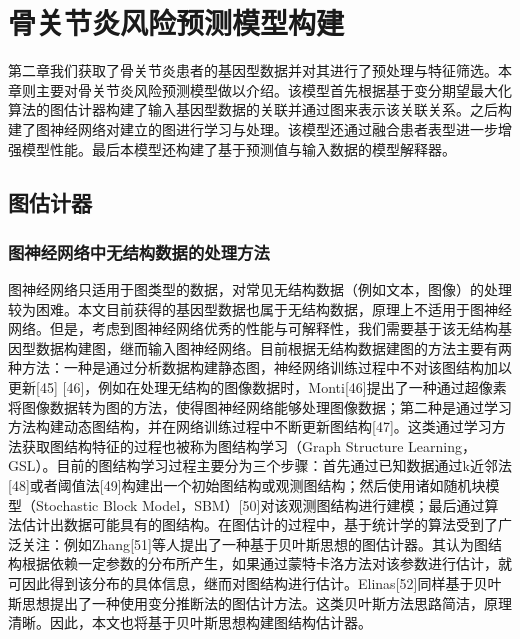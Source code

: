 \documentclass[
]{article}
\begin{document}
\hypertarget{ux9aa8ux5173ux8282ux708eux98ceux9669ux9884ux6d4bux6a21ux578bux6784ux5efa}{%
\section{骨关节炎风险预测模型构建}\label{ux9aa8ux5173ux8282ux708eux98ceux9669ux9884ux6d4bux6a21ux578bux6784ux5efa}}

第二章我们获取了骨关节炎患者的基因型数据并对其进行了预处理与特征筛选。本章则主要对骨关节炎风险预测模型做以介绍。该模型首先根据基于变分期望最大化算法的图估计器构建了输入基因型数据的关联并通过图来表示该关联关系。之后构建了图神经网络对建立的图进行学习与处理。该模型还通过融合患者表型进一步增强模型性能。最后本模型还构建了基于预测值与输入数据的模型解释器。

\hypertarget{ux56feux4f30ux8ba1ux5668}{%
\subsection{图估计器}\label{ux56feux4f30ux8ba1ux5668}}

\hypertarget{ux56feux795eux7ecfux7f51ux7edcux4e2dux65e0ux7ed3ux6784ux6570ux636eux7684ux5904ux7406ux65b9ux6cd5}{%
\subsubsection{图神经网络中无结构数据的处理方法}\label{ux56feux795eux7ecfux7f51ux7edcux4e2dux65e0ux7ed3ux6784ux6570ux636eux7684ux5904ux7406ux65b9ux6cd5}}

图神经网络只适用于图类型的数据，对常见无结构数据（例如文本，图像）的处理较为困难。本文目前获得的基因型数据也属于无结构数据，原理上不适用于图神经网络。但是，考虑到图神经网络优秀的性能与可解释性，我们需要基于该无结构基因型数据构建图，继而输入图神经网络。目前根据无结构数据建图的方法主要有两种方法：一种是通过分析数据构建静态图，神经网络训练过程中不对该图结构加以更新{[}45{]}
{[}46{]}，例如在处理无结构的图像数据时，Monti{[}46{]}提出了一种通过超像素将图像数据转为图的方法，使得图神经网络能够处理图像数据；第二种是通过学习方法构建动态图结构，并在网络训练过程中不断更新图结构{[}47{]}。这类通过学习方法获取图结构特征的过程也被称为图结构学习（Graph
Structure
Learning，GSL）。目前的图结构学习过程主要分为三个步骤：首先通过已知数据通过k近邻法{[}48{]}或者阈值法{[}49{]}构建出一个初始图结构或观测图结构；然后使用诸如随机块模型（Stochastic
Block
Model，SBM）{[}50{]}对该观测图结构进行建模；最后通过算法估计出数据可能具有的图结构。在图估计的过程中，基于统计学的算法受到了广泛关注：例如Zhang{[}51{]}等人提出了一种基于贝叶斯思想的图估计器。其认为图结构根据依赖一定参数的分布所产生，如果通过蒙特卡洛方法对该参数进行估计，就可因此得到该分布的具体信息，继而对图结构进行估计。Elinas{[}52{]}同样基于贝叶斯思想提出了一种使用变分推断法的图估计方法。这类贝叶斯方法思路简洁，原理清晰。因此，本文也将基于贝叶斯思想构建图结构估计器。
\end{document}

